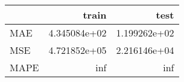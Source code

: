 \begin{tabular}{lrr}
\toprule
{} &         train &          test \\
\midrule
MAE  &  4.345084e+02 &  1.199262e+02 \\
MSE  &  4.721852e+05 &  2.216146e+04 \\
MAPE &           inf &           inf \\
\bottomrule
\end{tabular}
